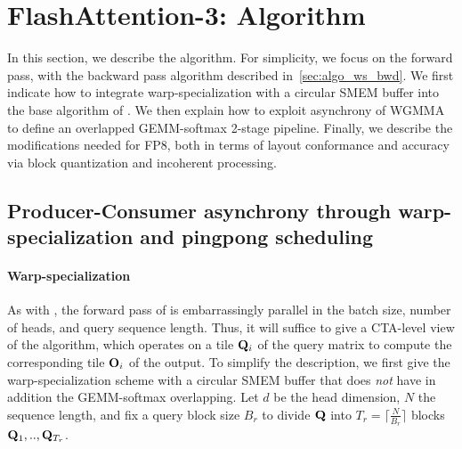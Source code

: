 \section{FlashAttention-3: Algorithm}
\label{sec:algo}

In this section, we describe the \fat algorithm. For simplicity, we focus on the
forward pass, with the backward pass algorithm described in~\cref{sec:algo_ws_bwd}. We first indicate how to integrate warp-specialization with a circular SMEM buffer into the base algorithm of \faa. We then explain how to exploit asynchrony of WGMMA to define an overlapped GEMM-softmax 2-stage pipeline. Finally, we describe the modifications needed for FP8, both in terms of layout conformance and accuracy via block quantization and incoherent processing.

\subsection{Producer-Consumer asynchrony through warp-specialization and
  pingpong scheduling}
\label{sec:algo_ws}

\paragraph{Warp-specialization}
As with \faa, the forward pass of \fat is embarrassingly parallel in the batch size, number of heads, and query sequence length.
Thus, it will suffice to give a CTA-level view of the algorithm, which operates on a tile $\mathbf{Q}_i$ of the query matrix to compute the corresponding tile $\mathbf{O}_i$ of the output.
To simplify the description, we first give the warp-specialization scheme with a circular SMEM buffer that does \emph{not} have in addition the GEMM-softmax overlapping.
Let $d$ be the head dimension, $N$ the sequence length, and fix a query block size $B_r$ to divide $\mathbf{Q}$ into $T_r = \lceil \frac{N}{B_r} \rceil$ blocks $\mathbf{Q}_1, .., \mathbf{Q}_{T_r}$.

